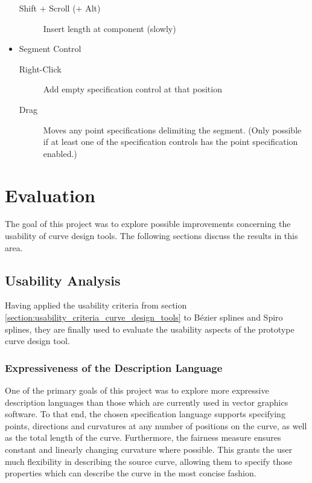 \documentclass[a4paper]{article}
\begin{document}
\begin{itemize}
\begin{description}
							\item[Shift + Scroll (+ Alt)] Insert length at component (slowly)
						\end{description}
						\item Segment Control
						\begin{description}
							\item[Right-Click] Add empty specification control at that position
							\item[Drag] Moves any point specifications delimiting the segment. (Only possible if at least one of the specification controls has the point specification enabled.)
						\end{description}
					\end{itemize}
		
	\section{Evaluation}
	\label{section:evaluation}

		The goal of this project was to explore possible improvements concerning the usability of curve design tools. The following sections discuss the results in this area.

		\subsection{Usability Analysis}
		\label{section:usability_analysis}

			Having applied the usability criteria from section \ref{section:usability_criteria_curve_design_tools} to Bézier splines and Spiro splines, they are finally used to evaluate the usability aspects of the prototype curve design tool.

			\subsubsection{Expressiveness of the Description Language}
			\label{section:expressiveness_description_language}

				One of the primary goals of this project was to explore more expressive description languages than those which are currently used in vector graphics software. To that end, the chosen specification language supports specifying points, directions and curvatures at any number of positions on the curve, as well as the total length of the curve. Furthermore, the fairness measure ensures constant and linearly changing curvature where possible. This grants the user much flexibility in describing the source curve, allowing them to specify those properties which can describe the curve in the most concise fashion.
\end{document}
